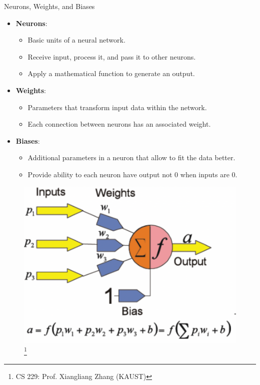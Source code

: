 \documentclass[10pt, hyperref={colorlinks = true,linkcolor = blue}]{beamer}
\begin{document}
{{{\begin{frame}{Neurons, Weights, and Biases}
 \begin{itemize}[<+->]
        \item \textbf{Neurons}:
        \begin{itemize}
            \item Basic units of a neural network.
            \item Receive input, process it, and pass it to other neurons.
            \item Apply a mathematical function to generate an output.
        \end{itemize}
        \item \textbf{Weights}:
        \begin{itemize}
            \item Parameters that transform input data within the network.
            \item Each connection between neurons has an associated weight.
        \end{itemize}
        \item \textbf{Biases}:
        \begin{itemize}
            \item Additional parameters in a neuron that allow to fit the data better.
            \item Provide ability to each neuron have output not 0 when inputs are 0.
        \end{itemize}
    \end{itemize}
    \begin{figure}
        \begin{center}
            \includegraphics[width=0.4\linewidth]{figures/neurons.pdf}\footnote{CS 229: Prof. Xiangliang Zhang (KAUST)}
        \end{center}
    \end{figure}
\end{frame}

}}}
\end{document}
